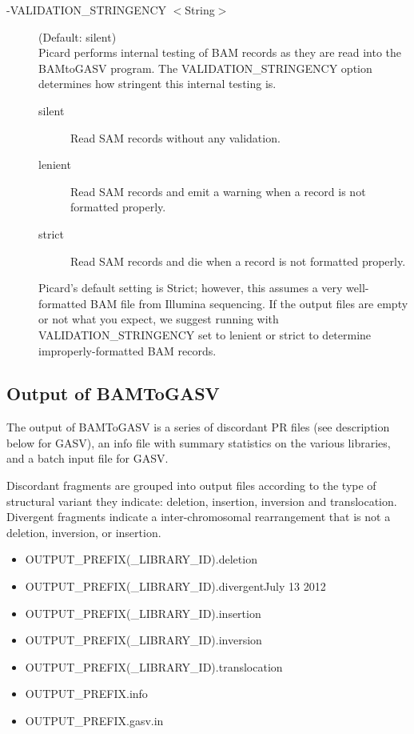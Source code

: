 \documentclass[11pt]{article}
\begin{document}
\begin{description}
\item[-VALIDATION\_STRINGENCY $<$String$>$] (Default: silent)\\
Picard performs internal testing of BAM records as they are read into the BAMtoGASV program.  The VALIDATION\_STRINGENCY option determines how stringent this internal testing is.  
\begin{description}
\item[silent] Read SAM records without any validation. 
\item[lenient] Read SAM records and emit a warning when a record is not formatted properly. 
\item[strict] Read SAM records and die when a record is not formatted properly.
\end{description}
Picard's default setting is Strict; however, this assumes a very well-formatted BAM file from Illumina sequencing.  If the output files are empty or not what you expect, we suggest running with VALIDATION\_STRINGENCY set to lenient or strict to determine improperly-formatted BAM records.
\end{description}
 
\subsection{Output of BAMToGASV}

The output of BAMToGASV is a series of discordant PR files (see description below for GASV), an info file with summary statistics on the various libraries, and a batch input file for GASV.  

Discordant fragments are grouped into output files according to the type of structural variant they indicate: deletion, insertion, inversion and translocation. Divergent fragments indicate a inter-chromosomal rearrangement that is not a deletion, inversion, or insertion.

\begin{itemize}
\item[] OUTPUT\_PREFIX(\_LIBRARY\_ID).deletion
\item[] OUTPUT\_PREFIX(\_LIBRARY\_ID).divergentJuly 13 2012
\item[] OUTPUT\_PREFIX(\_LIBRARY\_ID).insertion
\item[] OUTPUT\_PREFIX(\_LIBRARY\_ID).inversion
\item[] OUTPUT\_PREFIX(\_LIBRARY\_ID).translocation
\item[] OUTPUT\_PREFIX.info
\item[] OUTPUT\_PREFIX.gasv.in
\end{itemize}
\end{document}
